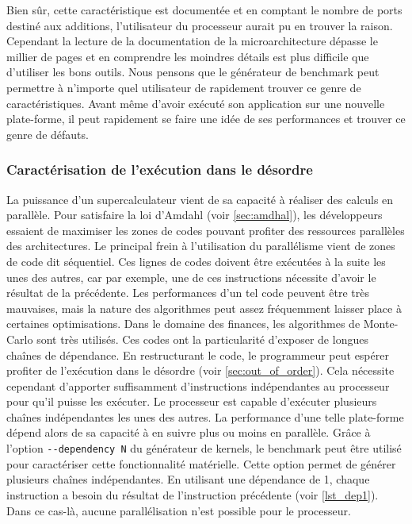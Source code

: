    Bien sûr, cette caractéristique est documentée et en comptant le nombre de ports destiné aux additions, l'utilisateur du processeur aurait pu en trouver la raison. Cependant la lecture de la documentation de la microarchitecture dépasse le millier de pages et en comprendre les moindres détails est plus difficile que d'utiliser les bons outils. Nous pensons que le générateur de benchmark peut permettre à n'importe quel utilisateur de rapidement trouver ce genre de caractéristiques. Avant même d'avoir exécuté son application sur une nouvelle plate-forme, il peut rapidement se faire une idée de ses performances et trouver ce genre de défauts.




    \subsubsection{Caractérisation de l'exécution dans le désordre}

    La puissance d'un supercalculateur vient de sa capacité à réaliser des calculs en parallèle. Pour satisfaire la loi d'Amdahl (voir \autoref{sec:amdhal}), les développeurs essaient de maximiser les zones de codes pouvant profiter des ressources parallèles des architectures. Le principal frein à l'utilisation du parallélisme vient de zones de code dit séquentiel. Ces lignes de codes doivent être exécutées à la suite les unes des autres, car par exemple, une de ces instructions nécessite d'avoir le résultat de la précédente. Les performances d'un tel code peuvent être très mauvaises, mais la nature des algorithmes peut assez fréquemment laisser place à certaines optimisations. Dans le domaine des finances, les algorithmes de Monte-Carlo sont très utilisés. Ces codes ont la particularité d'exposer de longues chaînes de dépendance. En restructurant le code, le programmeur peut espérer profiter de l'exécution dans le désordre (voir \autoref{sec:out_of_order}). Cela nécessite cependant d'apporter suffisamment d'instructions indépendantes au processeur pour qu'il puisse les exécuter. Le processeur est capable d'exécuter plusieurs chaînes indépendantes les unes des autres. La performance d'une telle plate-forme dépend alors de sa capacité à en suivre plus ou moins en parallèle. Grâce à l'option \verb|--dependency N| du générateur de kernels, le benchmark peut être utilisé pour caractériser cette fonctionnalité matérielle. Cette option permet de générer plusieurs chaînes indépendantes. En utilisant une dépendance de 1, chaque instruction a besoin du résultat de l'instruction précédente (voir \autoref{lst_dep1}). Dans ce cas-là, aucune parallélisation n'est possible pour le processeur.
    

